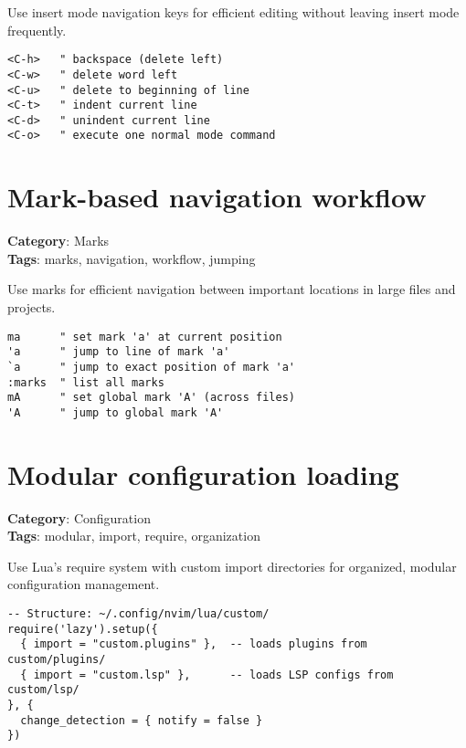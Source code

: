 {{{Use insert mode navigation keys for efficient editing without leaving insert mode frequently.

\begin{Exa*}{}
\begin{Verbatim}[fontsize=\footnotesize, breaklines, breakanywhere]
<C-h>   " backspace (delete left)
<C-w>   " delete word left  
<C-u>   " delete to beginning of line
<C-t>   " indent current line
<C-d>   " unindent current line
<C-o>   " execute one normal mode command
\end{Verbatim}
\end{Exa*}

\section{Mark-based navigation workflow}

\textbf{Category}: Marks\\ \textbf{Tags}: marks, navigation, workflow, jumping
\vspace{0.5cm}

Use marks for efficient navigation between important locations in large files and projects.

\begin{Exa*}{}
\begin{Verbatim}[fontsize=\footnotesize, breaklines, breakanywhere]
ma      " set mark 'a' at current position
'a      " jump to line of mark 'a'
`a      " jump to exact position of mark 'a'  
:marks  " list all marks
mA      " set global mark 'A' (across files)
'A      " jump to global mark 'A'
\end{Verbatim}
\end{Exa*}

\section{Modular configuration loading}

\textbf{Category}: Configuration\\ \textbf{Tags}: modular, import, require, organization
\vspace{0.5cm}

Use Lua's require system with custom import directories for organized, modular configuration management.

\begin{Exa*}{}
\begin{Verbatim}[fontsize=\footnotesize, breaklines, breakanywhere]
-- Structure: ~/.config/nvim/lua/custom/
require('lazy').setup({
  { import = "custom.plugins" },  -- loads plugins from custom/plugins/
  { import = "custom.lsp" },      -- loads LSP configs from custom/lsp/
}, {
  change_detection = { notify = false }
})
\end{Verbatim}
\end{Exa*}

}}}
